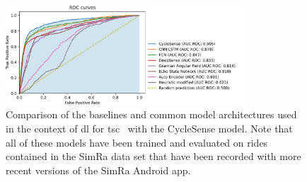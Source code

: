 \begin{figure}[t]
	\centering
	\includegraphics[width=0.8\textwidth]{fig/roc_auc_results_legend.png}
	\caption{Comparison of the baselines and common model architectures used in the context of \ac{dl} for \ac{tsc}~\cite{ismail2019deep} with the CycleSense model. Note that all of these models have been trained and evaluated on rides contained in the SimRa data set that have been recorded with more recent versions of the SimRa Android app.}
	\label{fig:roc-auc-results}
\end{figure}

\begin{table}
	\centering
\caption{Comparison of the baselines and common model architectures used in the context of \ac{dl} for \ac{tsc}~\cite{ismail2019deep} with the CycleSense model. See the discussion in Section~\ref{subsec:metrics} about the usefulness of various metrics. Note also that all of these models have been trained and evaluated on rides contained in the SimRa data set that have been recorded with more recent versions of the SimRa Android app. For all models the threshold which optimizes Youden's index\cite{youden1950index} were chosen.}
\label{tab:roc-auc-results}
\end{table}

